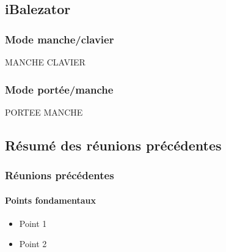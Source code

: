 	\subsection{iBalezator}

	\begin{frame}
		\frametitle{Mode manche/clavier}
			MANCHE CLAVIER
	\end{frame}

	\begin{frame}
		\frametitle{Mode portée/manche}
			PORTEE MANCHE
 
	\end{frame}



	\subsection{Résumé des réunions précédentes}

	\begin{frame}
		\frametitle{Réunions précédentes}
      		\framesubtitle{Points fondamentaux}
	\begin{itemize}
		\item Point 1 	
		\item Point 2
	\end{itemize}

	\end{frame}

